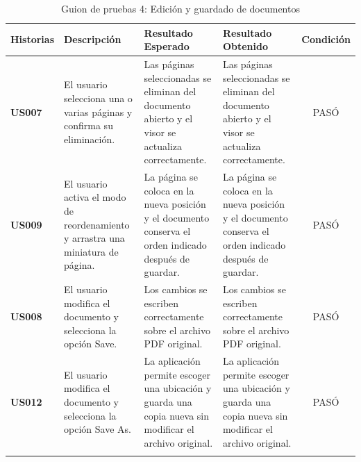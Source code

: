 \begin{longtable}{ | p{2cm} | p{3cm} | p{4cm} | p{4cm} | c |}
      \hline
      \textbf{Historias} & \textbf{Descripción} & \textbf{Resultado Esperado} & \textbf{Resultado Obtenido} & \textbf{Condición}\\
      \hline
      \textbf{US007} & El usuario selecciona una o varias páginas y confirma su eliminación. & Las páginas seleccionadas se eliminan del documento abierto y el visor se actualiza correctamente. & Las páginas seleccionadas se eliminan del documento abierto y el visor se actualiza correctamente. & PASÓ \\
      \hline

      \textbf{US009} & El usuario activa el modo de reordenamiento y arrastra una miniatura de página. & La página se coloca en la nueva posición y el documento conserva el orden indicado después de guardar. & La página se coloca en la nueva posición y el documento conserva el orden indicado después de guardar. & PASÓ \\
      \hline

      \textbf{US008} & El usuario modifica el documento y selecciona la opción Save. & Los cambios se escriben correctamente sobre el archivo PDF original. & Los cambios se escriben correctamente sobre el archivo PDF original. & PASÓ \\
      \hline

      \textbf{US012} & El usuario modifica el documento y selecciona la opción Save As. & La aplicación permite escoger una ubicación y guarda una copia nueva sin modificar el archivo original. & La aplicación permite escoger una ubicación y guarda una copia nueva sin modificar el archivo original. & PASÓ \\
      \hline
      
      \caption{Guion de pruebas 4: Edición y guardado de documentos}
      \label{TestScript1}
\end{longtable}

